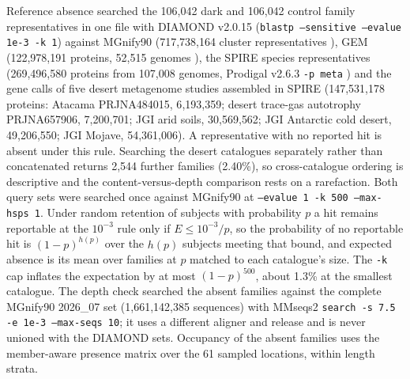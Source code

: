 \documentclass[11pt]{article}
\begin{document}
Reference absence searched the 106{,}042 dark and 106{,}042 control family representatives in one
file with DIAMOND v2.0.15 (\texttt{blastp --sensitive --evalue 1e-3 -k 1}) against MGnify90
(717{,}738{,}164 cluster representatives \citep{richardson2023mgnify}), GEM (122{,}978{,}191
proteins, 52{,}515 genomes \citep{nayfach2021gem}), the SPIRE species representatives (269{,}496{,}580
proteins from 107{,}008 genomes, Prodigal v2.6.3 \texttt{-p meta} \citep{schmidt2024spire}) and the
gene calls of five desert metagenome studies assembled in SPIRE (147{,}531{,}178 proteins: Atacama
PRJNA484015, 6{,}193{,}359; desert trace-gas autotrophy PRJNA657906, 7{,}200{,}701; JGI arid soils,
30{,}569{,}562; JGI Antarctic cold desert, 49{,}206{,}550; JGI Mojave, 54{,}361{,}006). A
representative with no reported hit is absent under this rule. Searching the desert catalogues
separately rather than concatenated returns 2{,}544 further families (2.40\%), so cross-catalogue
ordering is descriptive and the content-versus-depth comparison rests on a rarefaction. Both query
sets were searched once against MGnify90 at \texttt{--evalue 1 -k 500 --max-hsps 1}. Under random
retention of subjects with probability $p$ a hit remains reportable at the $10^{-3}$ rule only if
$E \leq 10^{-3}/p$, so the probability of no reportable hit is $(1-p)^{h(p)}$ over the $h(p)$ subjects
meeting that bound, and expected absence is its mean over families at $p$ matched to each catalogue's
size. The \texttt{-k} cap inflates the expectation by at most $(1-p)^{500}$, about 1.3\% at the
smallest catalogue. The depth check searched the absent families against the complete MGnify90
2026\_07 set (1{,}661{,}142{,}385 sequences) with MMseqs2 \texttt{search -s 7.5 -e 1e-3 --max-seqs 10};
it uses a different aligner and release and is never unioned with the DIAMOND sets. Occupancy of the
absent families uses the member-aware presence matrix over the 61 sampled locations, within length strata.
\end{document}
